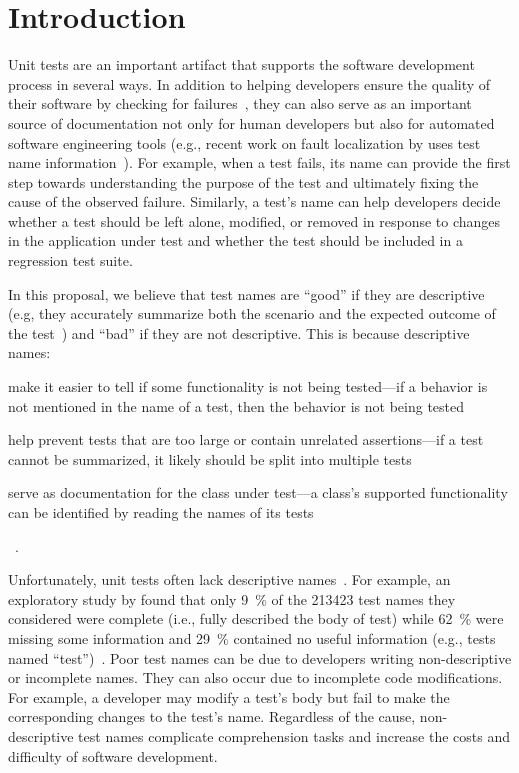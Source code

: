 \section{Introduction}
\label{sec:introduction}

Unit tests are an important artifact that supports the software development process in several ways.
%
In addition to helping developers ensure the quality of their software by checking for failures~\cite{daka2014survey}, they can also serve as an important source of documentation not only for human developers but also for automated software engineering tools (e.g., recent work on fault localization by \citeauthor{li2019deepfl} uses test name information~\cite{li2019deepfl}).
%
For example, when a test fails, its name can provide the first step towards understanding the purpose of the test and ultimately fixing the cause of the observed failure.
%
Similarly, a test's name can help developers decide whether a test should be left alone, modified, or removed in response to changes in the application under test and whether the test should be included in a regression test suite.


In this proposal, we believe that test names are \enquote{good} if they are descriptive (e.g, they accurately summarize both the scenario and the expected outcome of the test~\cite{trenk14}) and \enquote{bad} if they are not descriptive.
%
This is because descriptive names:
\begin{enumerate*}
\item make it easier to tell if some functionality is not being tested---if a behavior is not mentioned in the name of a test, then the behavior is not being tested
\item help prevent tests that are too large or contain unrelated assertions---if a test cannot be summarized, it likely should be split into multiple tests
\item serve as documentation for the class under test---a class's supported functionality can be identified by reading the names of its tests
\end{enumerate*}~\cite{zhang2015automatically}.


Unfortunately, unit tests often lack descriptive names~\cite{zhang2015automatically, daka2017generating}.
%
For example, an exploratory study by \citeauthor{zhang2015automatically} found that only \SI{9}{\percent} of the \num{213423} test names they considered were complete (i.e., fully described the body of test) while \SI{62}{\percent} were missing some information and \SI{29}{\percent} contained no useful information (e.g., tests named \enquote{test})~\cite{zhang2015automatically}.
%
Poor test names can be due to developers writing non-descriptive or incomplete names.
%
They can also occur due to incomplete code modifications.
%
For example, a developer may modify a test's body but fail to make the corresponding changes to the test's name.
%
Regardless of the cause, non-descriptive test names complicate comprehension tasks and increase the costs and difficulty of software development.


